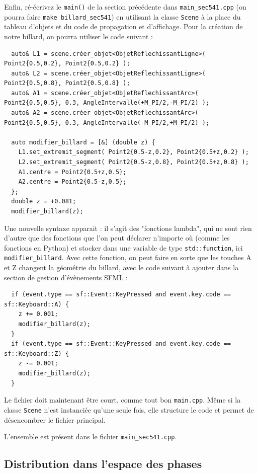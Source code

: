 \documentclass{book}
\newcommand{\inline}[1]{\texttt{#1}}
\def\filename{\texttt}
\begin{document}
Enfin, ré-écrivez le \inline{main()} de la section précédente dans \inline{main_sec541.cpp} (on pourra faire \texttt{make billard\_sec541}) en utilisant la classe \inline{Scene} à la place du tableau d'objets et du code de propagation et d'affichage. Pour la création de notre billard, on pourra utiliser le code suivant :
\begin{verbatim}
  auto& L1 = scene.créer_objet<ObjetReflechissantLigne>( Point2{0.5,0.2}, Point2{0.5,0.2} );
  auto& L2 = scene.créer_objet<ObjetReflechissantLigne>( Point2{0.5,0.8}, Point2{0.5,0.8} );
  auto& A1 = scene.créer_objet<ObjetReflechissantArc>( Point2{0.5,0.5}, 0.3, AngleIntervalle(+M_PI/2,-M_PI/2) );
  auto& A2 = scene.créer_objet<ObjetReflechissantArc>( Point2{0.5,0.5}, 0.3, AngleIntervalle(-M_PI/2,+M_PI/2) );

  auto modifier_billard = [&] (double z) {
    L1.set_extremit_segment( Point2{0.5-z,0.2}, Point2{0.5+z,0.2} );
    L2.set_extremit_segment( Point2{0.5-z,0.8}, Point2{0.5+z,0.8} );
    A1.centre = Point2{0.5+z,0.5};
    A2.centre = Point2{0.5-z,0.5};
  };
  double z = +0.081;
  modifier_billard(z);
\end{verbatim}
Une nouvelle syntaxe apparait : il s'agit des "fonctions lambda", qui ne sont rien d'autre que des fonctions que l'on peut déclarer n'importe où (comme les fonctions en Python) et stocker dans une variable de type \inline{std::function}, ici \inline{modifier_billard}. Avec cette fonction, on peut faire en sorte que les touches A et Z changent la géométrie du billard, avec le code suivant à ajouter dans la section de gestion d'évènements SFML :
\begin{verbatim}
  if (event.type == sf::Event::KeyPressed and event.key.code == sf::Keyboard::A) {
    z += 0.001;
    modifier_billard(z);
  }
  if (event.type == sf::Event::KeyPressed and event.key.code == sf::Keyboard::Z) {
    z -= 0.001;
    modifier_billard(z);
  }
\end{verbatim}

Le fichier doit maintenant être court, comme tout bon \inline{main.cpp}. Même si la classe \inline{Scene} n'est instanciée qu'une seule fois, elle structure le code et permet de désencombrer le fichier principal.

\begin{correction}
L'ensemble est présent dans le fichier \filename{main\_sec541.cpp}.
\end{correction}

\subsection{Distribution dans l'espace des phases}
\end{document}
